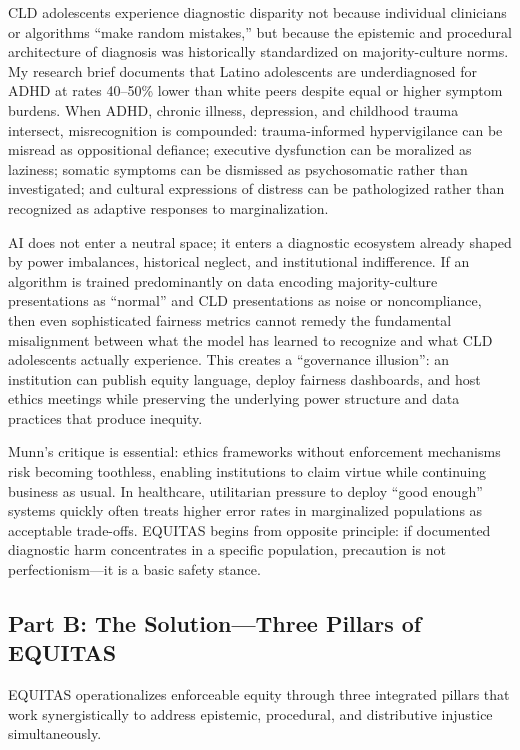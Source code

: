 \documentclass[12pt,a4paper]{article}
\begin{document}
CLD adolescents experience diagnostic disparity not because individual clinicians or algorithms ``make random mistakes,'' but because the epistemic and procedural architecture of diagnosis was historically standardized on majority-culture norms.\cite{garcia_ed415} My research brief documents that Latino adolescents are underdiagnosed for ADHD at rates 40--50\% lower than white peers despite equal or higher symptom burdens.\cite{garcia_ed415} When ADHD, chronic illness, depression, and childhood trauma intersect, misrecognition is compounded: trauma-informed hypervigilance can be misread as oppositional defiance; executive dysfunction can be moralized as laziness; somatic symptoms can be dismissed as psychosomatic rather than investigated; and cultural expressions of distress can be pathologized rather than recognized as adaptive responses to marginalization.\cite{garcia_ed415}

AI does not enter a neutral space; it enters a diagnostic ecosystem already shaped by power imbalances, historical neglect, and institutional indifference. If an algorithm is trained predominantly on data encoding majority-culture presentations as ``normal'' and CLD presentations as noise or noncompliance, then even sophisticated fairness metrics cannot remedy the fundamental misalignment between what the model has learned to recognize and what CLD adolescents actually experience.\cite{marko2025} This creates a ``governance illusion'': an institution can publish equity language, deploy fairness dashboards, and host ethics meetings while preserving the underlying power structure and data practices that produce inequity.\cite{munn_idai700}

Munn's critique is essential: ethics frameworks without enforcement mechanisms risk becoming toothless, enabling institutions to claim virtue while continuing business as usual.\cite{munn_idai700} In healthcare, utilitarian pressure to deploy ``good enough'' systems quickly often treats higher error rates in marginalized populations as acceptable trade-offs. EQUITAS begins from opposite principle: if documented diagnostic harm concentrates in a specific population, precaution is not perfectionism—it is a basic safety stance.\cite{garcia_ed415}

\subsection{Part B: The Solution—Three Pillars of EQUITAS}

EQUITAS operationalizes enforceable equity through three integrated pillars that work synergistically to address epistemic, procedural, and distributive injustice simultaneously.
\end{document}
